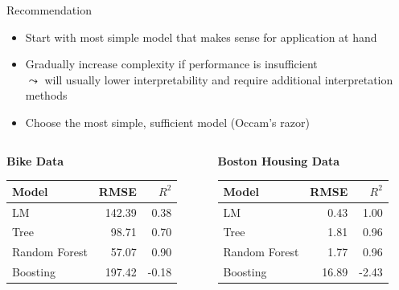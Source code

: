 \documentclass[11pt,compress,t,notes=noshow, aspectratio=169, xcolor=table]{beamer}
\begin{document}
\begin{frame}{Recommendation}
    \begin{itemize}
        \item Start with most simple model that makes sense for application at hand
        \item Gradually increase complexity if performance is insufficient\\
        $\leadsto$ will usually lower interpretability and require additional interpretation methods
        \item Choose the most simple, sufficient model (Occam's razor)
    \end{itemize} 

    \bigskip

\begin{columns}[T, totalwidth=\textwidth]
\begin{column}{0.5\textwidth}
\centering \textbf{Bike Data}
    \begin{table}[ht]
        \centering
        \begin{tabular}{lrr}
            \hline
            Model & RMSE & $R^2$ \\ 
            \hline
            LM & 142.39 & 0.38 \\ 
            Tree & 98.71 & 0.70 \\ 
            Random Forest & 57.07 & 0.90 \\ 
            Boosting & 197.42 & -0.18 \\  
            \hline
        \end{tabular}
    \end{table}
\end{column}
\begin{column}{0.5\textwidth}
\centering \textbf{Boston Housing Data}
    \begin{table}[ht]
        \centering
        \begin{tabular}{lrr}
            \hline
            Model & RMSE & $R^2$ \\ 
            \hline
            LM & 0.43 & 1.00 \\ 
            Tree & 1.81 & 0.96 \\ 
            Random Forest & 1.77 & 0.96 \\ 
            Boosting & 16.89 & -2.43 \\
            \hline
        \end{tabular}
    \end{table}
\end{column}
\end{columns}
\end{frame}


\endlecture
\end{document}
